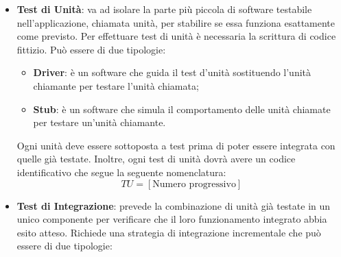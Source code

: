                 \begin{itemize}
                    \item \textbf{Test di Unità}:
                        va ad isolare la parte più piccola di software testabile nell'applicazione,
                        chiamata unità, per stabilire se essa funziona esattamente come previsto.
                        Per effettuare test di unità è necessaria la scrittura di codice fittizio.
                        Può essere di due tipologie:

                            \begin{itemize}
                                \item \textbf{Driver}: è un software che guida il test d'unità sostituendo
                                l'unità chiamante per testare l'unità chiamata;
                                \item \textbf{Stub}: è un software che simula il comportamento delle unità
                                chiamate per testare un'unità chiamante.
                            \end{itemize}

                        Ogni unità deve essere sottoposta a test prima di poter essere integrata con
                        quelle già testate. Inoltre, ogni test di unità dovrà avere un codice identificativo
                        che segue la seguente nomenclatura:
                        \[TU = [\mbox{Numero progressivo}]\]
                        
                    \item \textbf{Test di Integrazione}:
                        prevede la combinazione di unità già testate in un unico componente per verificare
                        che il loro funzionamento integrato abbia esito atteso.
                        Richiede una strategia di integrazione incrementale che può essere di due tipologie:


\end{itemize}
